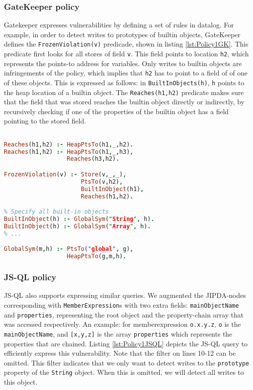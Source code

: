 \subsubsection*{GateKeeper policy}
Gatekeeper expresses vulnerabilities by defining a set of rules in datalog. For example, in order to detect writes to prototypes of builtin objects, GateKeeper defines the \texttt{FrozenViolation(v)} predicade, shown in listing \ref{lst:Policy1GK}. This predicate first looks for all stores of field \texttt{v}. This field points to location \texttt{h2}, which represents the points-to address for variables. Only writes to builtin objects are infringements of the policy, which implies that \texttt{h2} has to point to a field of of one of these objects. This is expressed as follows: in \texttt{BuiltInObjects(h)}, \texttt{h} points to the heap location of a builtin object. The \texttt{Reaches(h1,h2)} predicate makes sure that the field that was stored reaches the builtin object directly or indirectly, by recursively checking if one of the properties of the builtin object has a field pointing to the stored field.

\begin{lstlisting}[label={lst:Policy1GK},language=Prolog,caption=Policy 1 in GateKeeper,mathescape=true]  % float=t?

Reaches(h1,h2) :- HeapPtsTo(h1,_,h2).
Reaches(h1,h2) :- HeapPtsTo(h1,_,h3),
                  Reaches(h3,h2).

FrozenViolation(v) :- Store(v,_,_),
                      PtsTo(v,h2),
                      BuiltInObject(h1),
                      Reaches(h1,h2).

% Specify all built-in objects
BuiltInObject(h) :- GlobalSym("String", h).
BuiltInObject(h) :- GlobalSym("Array", h).
% ...

GlobalSym(m,h) :- PtsTo("global", g),
                  HeapPtsTo(g,m,h).

\end{lstlisting}

\subsubsection*{JS-QL policy}
JS-QL also supports expressing similar queries. We augmented the JIPDA-nodes corresponding with \texttt{MemberExpression}s with two extra fields: \texttt{mainObjectName} and \texttt{properties}, representing the root object and the property-chain array that was accessed respectively. An example: for memberexpression \texttt{o.x.y.z}, \texttt{o} is the \texttt{mainObjectName}, and \texttt{[x,y,z]} is the array \texttt{properties} which represents the properties that are chained. Listing \ref{lst:Policy1JSQL} depicts the JS-QL query to efficiently express this vulnerability. Note that the filter on lines 10-12 can be omitted. This filter indicates that we only want to detect writes to the \texttt{prototype} property of the \texttt{String} object. When this is omitted, we will detect all writes to this object.

